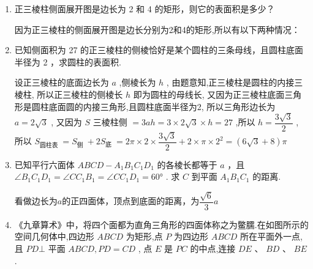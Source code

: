 \begin{enumerate}
    \item 正三棱柱侧面展开图是边长为 2 和 4 的矩形，则它的表面积是多少？
    \begin{jieda}
        因为正三棱柱的侧面展开图是边长分别为2和4的矩形,所以有以下两种情况：
    \end{jieda}

    \item 已知侧面积为 27 的正三棱柱的侧棱恰好是某个圆柱的三条母线，且圆柱底面半径为 2 ，求圆柱的表面积.
    \begin{jieda}
        设正三棱柱的底面边长为 $a$ ,侧棱长为 $h$ ,
        由题意知,正三棱柱是圆柱的内接三棱柱,
        所以正三棱柱的侧棱长 $h$ 即为圆柱的母线长,
        又因为正三棱柱底面三角形是圆柱底面圆的内接三角形,且圆柱底面半径为2,
        所以三角形边长为 $a = 2\sqrt{3}$ ,
        又因为 $S$ 三棱柱侧 $= {3ah} = 3 \times  2\sqrt{3} \times  h = {27}$ ,所以 $h = \dfrac{3\sqrt{3}}{2}$ ,
        所以 ${S}_{\text{圆柱表 }} = {S}_{\text{侧 }} + 2{S}_{\text{底 }} = {2\pi } \times  2 \times  \dfrac{3\sqrt{3}}{2} + 2 \times  \pi  \times  {2}^{2} = \left( {6\sqrt{3} + 8}\right) {\pi }$
    \end{jieda}

    \item 已知平行六面体 ${{ABCD}} - {{A}}_{1}{{B}}_{1}{{C}}_{1}{{D}}_{1}$ 的各棱长都等于 ${a}$ ，且 $\angle {{B}}_{1}{{C}}_{1}{{D}}_{1} = \angle {{{CC}}}_{1}{{B}}_{1} = \angle {{{CC}}}_{1}{{D}}_{1} = \ang{60}$ . 求 ${C}$ 到平面 ${{A}}_{1}{{B}}_{1}{{C}}_{1}$ 的距离.
    \begin{jieda}
        看做边长为$a$的正四面体，顶点到底面的距离，为$\dfrac{\sqrt{6}}{3}a$
    \end{jieda}

    \item 《九章算术》中，将四个面都为直角三角形的四面体称之为鳖臑.在如图所示的空间几何体中,四边形 ${ABCD}$ 为矩形,点 $P$ 为四边形 ${ABCD}$ 所在平面外一点,且 ${PD} \bot$ 平面 ${ABCD},{PD} = {CD}$ , 点 $E$ 是 ${PC}$ 的中点,连接 ${DE}\text{ 、 }{BD}\text{ 、 }{BE}$ .
    

\end{enumerate}

